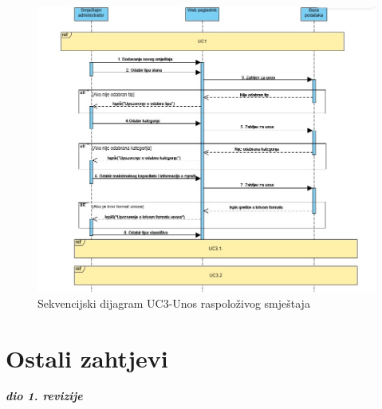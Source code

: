 				\begin{figure}[H]
					\includegraphics[width=\linewidth]{slike/DentAll-Sekvencijski-uc3-unos_raspoloživog_smještaja.jpg}
					\centering
					\caption{Sekvencijski dijagram UC3-Unos raspoloživog smještaja}
					\label{fig:Sekvencijski dijagram UC3}
				\end{figure}
				
				\eject
	
		\section{Ostali zahtjevi}
		
			\textbf{\textit{dio 1. revizije}}\\
		 
